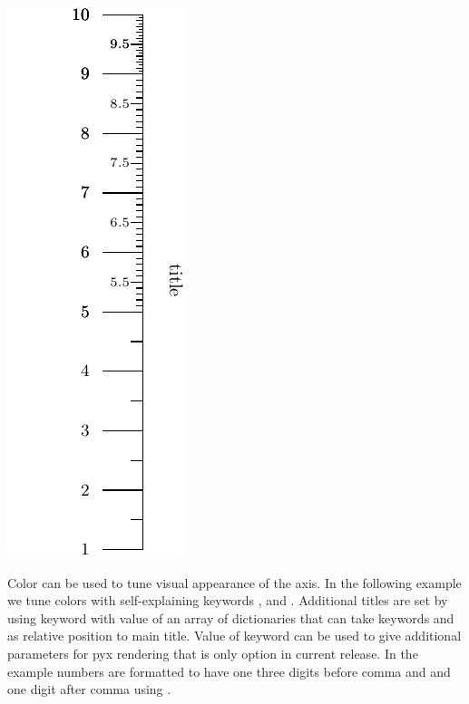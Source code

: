 \documentclass[a4paper,11pt,english]{sphinxmanual}
\begin{document}
\includegraphics{ex_axes_4.pdf}

Color can be used to tune visual appearance of the axis. In the following example we tune colors with self-explaining
keywords ,  and . Additional titles are set by using keyword 
with value of an array of dictionaries that can take keywords  and  as relative position to main title.
Value of keyword  can be used to give additional parameters for pyx rendering
that is only option in current release. In the example numbers are formatted to have one three digits before comma and
and one digit after comma using .
\end{document}
